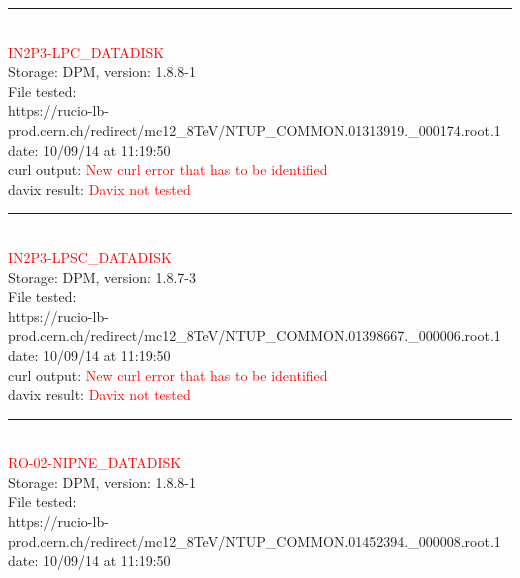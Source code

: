 \rule{\textwidth}{1pt}\\

\textcolor{red}{\normalsize{IN2P3-LPC\_DATADISK}}\\

Storage: DPM, version: 1.8.8-1\\

File tested:\\
\footnotesize{https://rucio-lb-prod.cern.ch/redirect/mc12\_8TeV/NTUP\_COMMON.01313919.\_000174.root.1}\\

date: 10/09/14 at 11:19:50\\

curl output:  \textcolor{red}{New curl error that has to be identified}\\

davix result:  \textcolor{red}{Davix not tested}\\

\rule{\textwidth}{1pt}\\

\textcolor{red}{\normalsize{IN2P3-LPSC\_DATADISK}}\\

Storage: DPM, version: 1.8.7-3\\

File tested:\\
\footnotesize{https://rucio-lb-prod.cern.ch/redirect/mc12\_8TeV/NTUP\_COMMON.01398667.\_000006.root.1}\\

date: 10/09/14 at 11:19:50\\

curl output:  \textcolor{red}{New curl error that has to be identified}\\

davix result:  \textcolor{red}{Davix not tested}\\

\rule{\textwidth}{1pt}\\

\textcolor{red}{\normalsize{RO-02-NIPNE\_DATADISK}}\\

Storage: DPM, version: 1.8.8-1\\

File tested:\\
\footnotesize{https://rucio-lb-prod.cern.ch/redirect/mc12\_8TeV/NTUP\_COMMON.01452394.\_000008.root.1}\\

date: 10/09/14 at 11:19:50\\

